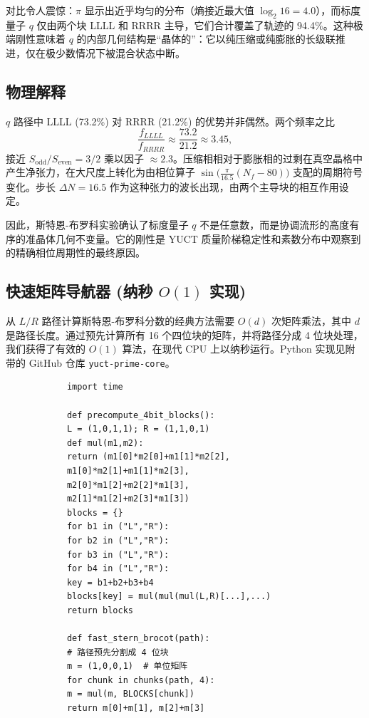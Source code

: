 \documentclass[11pt,a4paper]{article}
\begin{document}
	对比令人震惊：\(\pi\) 显示出近乎均匀的分布（熵接近最大值 \(\log_2 16 = 4.0\)），而标度量子 \(q\) 仅由两个块 LLLL 和 RRRR 主导，它们合计覆盖了轨迹的 94.4\%。这种极端刚性意味着 \(q\) 的内部几何结构是“晶体的”：它以纯压缩或纯膨胀的长级联推进，仅在极少数情况下被混合状态中断。
	
	\subsection{物理解释}
	
	\(q\) 路径中 LLLL (73.2\%) 对 RRRR (21.2\%) 的优势并非偶然。两个频率之比
	\[
	\frac{f_{LLLL}}{f_{RRRR}} \approx \frac{73.2}{21.2} \approx 3.45,
	\]
	接近 \(S_{\mathrm{odd}}/S_{\mathrm{even}} = 3/2\) 乘以因子 \(\approx 2.3\)。压缩相相对于膨胀相的过剩在真空晶格中产生净张力，在大尺度上转化为由相位算子 \(\sin\!\bigl(\frac{\pi}{16.5}(N_f-80)\bigr)\) 支配的周期符号变化。步长 \(\Delta N = 16.5\) 作为这种张力的波长出现，由两个主导块的相互作用设定。
	
	因此，斯特恩-布罗科实验确认了标度量子 \(q\) 不是任意数，而是协调流形的高度有序的准晶体几何不变量。它的刚性是 YUCT 质量阶梯稳定性和素数分布中观察到的精确相位周期性的最终原因。
	
	\subsection{快速矩阵导航器 (纳秒 \(O(1)\) 实现)}
	
	从 \(L/R\) 路径计算斯特恩-布罗科分数的经典方法需要 \(O(d)\) 次矩阵乘法，其中 \(d\) 是路径长度。通过预先计算所有 16 个四位块的矩阵，并将路径分成 4 位块处理，我们获得了有效的 \(O(1)\) 算法，在现代 CPU 上以纳秒运行。Python 实现见附带的 GitHub 仓库 \texttt{yuct-prime-core}。
	
	\begin{tcolorbox}[title=4 位块导航器 (Python), breakable]
		\begin{lstlisting}
			import time
			
			def precompute_4bit_blocks():
			L = (1,0,1,1); R = (1,1,0,1)
			def mul(m1,m2):
			return (m1[0]*m2[0]+m1[1]*m2[2],
			m1[0]*m2[1]+m1[1]*m2[3],
			m2[0]*m1[2]+m2[2]*m1[3],
			m2[1]*m1[2]+m2[3]*m1[3])
			blocks = {}
			for b1 in ("L","R"):
			for b2 in ("L","R"):
			for b3 in ("L","R"):
			for b4 in ("L","R"):
			key = b1+b2+b3+b4
			blocks[key] = mul(mul(mul(L,R)[...],...)
			return blocks
			
			def fast_stern_brocot(path):
			# 路径预先分割成 4 位块
			m = (1,0,0,1)  # 单位矩阵
			for chunk in chunks(path, 4):
			m = mul(m, BLOCKS[chunk])
			return m[0]+m[1], m[2]+m[3]
		\end{lstlisting}
	\end{tcolorbox}
	
\end{document}
